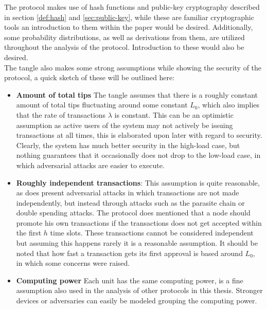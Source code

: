 The protocol makes use of hash functions and public-key cryptography described in section \ref{def:hash} and \ref{sec:public-key}, while these are familiar cryptographic tools an introduction to them within the paper would be desired. Additionally, some probability distributions, as well as derivations from them, are utilized throughout the analysis of the protocol. Introduction to these would also be desired.\\


The tangle also makes some strong assumptions while showing the security of the protocol, a quick sketch of these will be outlined here:
\begin{itemize}
    \item \textbf{Amount of total tips} The tangle assumes that there is a roughly constant amount of total tips fluctuating around some constant $L_0$, which also implies that the rate of transactions $\lambda$ is constant. This can be an optimistic assumption as active users of the system may not actively be issuing transactions at all times, this is elaborated upon later with regard to security. Clearly, the system has much better security in the high-load case, but nothing guarantees that it occasionally does not drop to the low-load case, in which adversarial attacks are easier to execute.
    \item \textbf{Roughly independent transactions}: This assumption is quite reasonable, as \cite{tangle} does present adversarial attacks in which transactions are not made independently, but instead through attacks such as the parasite chain or double spending attacks. The protocol does mentioned that a node should promote his own transactions if the transactions does not get accepted within the first $h$ time slots. These transactions cannot be considered independent but assuming this happens rarely it is a reasonable assumption. It should be noted that how fast a transaction gets its first approval is based around $L_0$, in which some concerns were raised.
    \item \textbf{Computing power} Each unit has the same computing power, is a fine assumption also used in the analysis of other protocols in this thesis. Stronger devices or adversaries can easily be modeled grouping the computing power.
\end{itemize}


